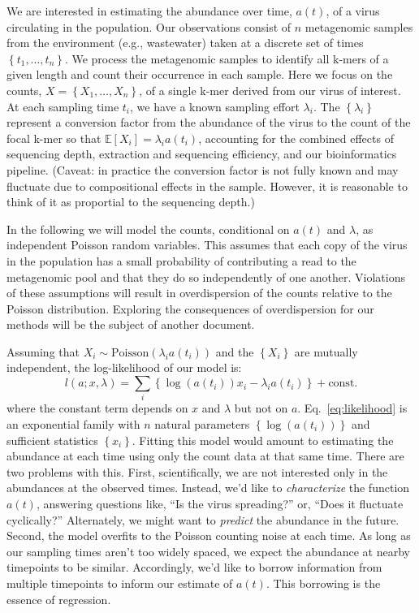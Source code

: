 \documentclass[12pt, letterpaper]{article}
\begin{document}
We are interested in estimating the abundance over time, $a(t)$, of a virus circulating in the population.
Our observations consist of $n$ metagenomic samples from the environment (e.g., wastewater) taken at a discrete set of times $\left\{t_1, \ldots, t_n\right\}$.
We process the metagenomic samples to identify all k-mers of a given length and count their occurrence in each sample.
Here we focus on the counts, $X = \left\{X_1, \ldots, X_n\right\}$, of a single k-mer derived from our virus of interest.
At each sampling time $t_i$, we have a known sampling effort $\lambda_i$.
The $\left\{\lambda_i\right\}$ represent a conversion factor from the abundance of the virus to the count of the focal k-mer so that $\mathbb{E}\left[X_i\right] = \lambda_i a(t_i)$,
accounting for the combined effects of sequencing depth, extraction and sequencing efficiency, and our bioinformatics pipeline.
(Caveat: in practice the conversion factor is not fully known and may fluctuate due to compositional effects in the sample. However, it is reasonable to think of it as proportial to the sequencing depth.)

In the following we will model the counts, conditional on $a(t)$ and $\lambda$, as independent Poisson random variables.
This assumes that each copy of the virus in the population has a small probability of contributing a read to the metagenomic pool and that they do so independently of one another.
Violations of these assumptions will result in overdispersion of the counts relative to the Poisson distribution.
Exploring the consequences of overdispersion for our methods will be the subject of another document.

Assuming that $X_i \sim \text{Poisson}\left(\lambda_i a(t_i)\right)$ and the $\left\{X_i\right\}$ are mutually independent, the log-likelihood of our model is:
\begin{equation}
    l(a; x, \lambda) = \sum_i \left\{\log(a(t_i)) x_i - \lambda_i a(t_i) \right\} + \text{const.}
    \label{eq:likelihood}
\end{equation}
where the constant term depends on $x$ and $\lambda$ but not on $a$.
Eq.~\ref{eq:likelihood} is an exponential family with $n$ natural parameters $\left\{\log(a(t_i))\right\}$ and sufficient statistics $\left\{x_i\right\}$.
Fitting this model would amount to estimating the abundance at each time using only the count data at that same time.
There are two problems with this.
First, scientifically, we are not interested only in the abundances at the observed times.
Instead, we'd like to \emph{characterize} the function $a(t)$, answering questions like, ``Is the virus spreading?'' or, ``Does it fluctuate cyclically?''
Alternately, we might want to \emph{predict} the abundance in the future.
Second, the model overfits to the Poisson counting noise at each time.
As long as our sampling times aren't too widely spaced, we expect the abundance at nearby timepoints to be similar.
Accordingly, we'd like to borrow information from multiple timepoints to inform our estimate of $a(t)$.
This borrowing is the essence of regression.
\end{document}
